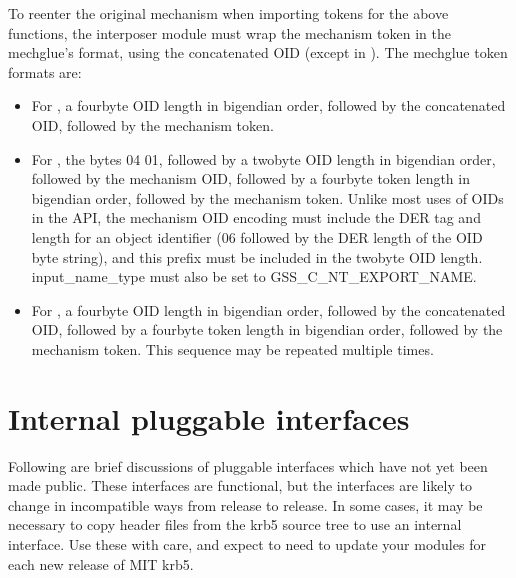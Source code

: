 \documentclass[letterpaper,10pt,english]{sphinxmanual}
\begin{document}
\sphinxAtStartPar
To re\sphinxhyphen{}enter the original mechanism when importing tokens for the above
functions, the interposer module must wrap the mechanism token in the
mechglue’s format, using the concatenated OID (except in
).  The mechglue token formats are:
\begin{itemize}
\item {} 
\sphinxAtStartPar
For , a four\sphinxhyphen{}byte OID length in big\sphinxhyphen{}endian
order, followed by the concatenated OID, followed by the mechanism
token.

\item {} 
\sphinxAtStartPar
For , the bytes 04 01, followed by a two\sphinxhyphen{}byte OID
length in big\sphinxhyphen{}endian order, followed by the mechanism OID, followed
by a four\sphinxhyphen{}byte token length in big\sphinxhyphen{}endian order, followed by the
mechanism token.  Unlike most uses of OIDs in the API, the mechanism
OID encoding must include the DER tag and length for an object
identifier (06 followed by the DER length of the OID byte string),
and this prefix must be included in the two\sphinxhyphen{}byte OID length.
input\_name\_type must also be set to GSS\_C\_NT\_EXPORT\_NAME.

\item {} 
\sphinxAtStartPar
For , a four\sphinxhyphen{}byte OID length in big\sphinxhyphen{}endian order,
followed by the concatenated OID, followed by a four\sphinxhyphen{}byte token
length in big\sphinxhyphen{}endian order, followed by the mechanism token.  This
sequence may be repeated multiple times.

\end{itemize}


\section{Internal pluggable interfaces}
\label{\detokenize{plugindev/internal:internal-pluggable-interfaces}}\label{\detokenize{plugindev/internal::doc}}
\sphinxAtStartPar
Following are brief discussions of pluggable interfaces which have not
yet been made public.  These interfaces are functional, but the
interfaces are likely to change in incompatible ways from release to
release.  In some cases, it may be necessary to copy header files from
the krb5 source tree to use an internal interface.  Use these with
care, and expect to need to update your modules for each new release
of MIT krb5.
\end{document}
